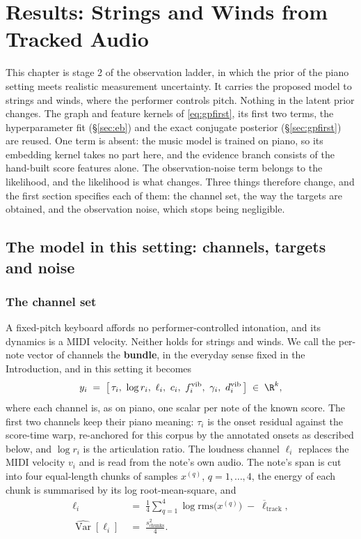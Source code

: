 \chapter{Results: Strings and Winds from Tracked Audio}
\label{ch:phase2}\label{sec:phase2}
This chapter is stage 2 of the observation ladder, in which the prior of
the piano setting meets realistic measurement uncertainty. It carries the
proposed model to strings and winds, where the performer controls pitch.
Nothing in the latent prior changes. The graph and feature kernels of
\eqref{eq:gpfirst}, its first two terms, the hyperparameter fit
(\S\ref{sec:eb}) and the exact conjugate posterior (\S\ref{sec:gpfirst})
are reused. One term is absent: the music model is trained on piano, so
its embedding kernel takes no part here, and the evidence branch consists
of the hand-built score features alone. The observation-noise term belongs
to the likelihood, and the likelihood is what changes. Three things
therefore change, and the first section specifies each of them: the
channel set, the way the targets are obtained, and the observation noise,
which stops being negligible.


\section{The model in this setting: channels, targets and noise}
\label{sec:phase2-delta}

\subsection{The channel set}
A fixed-pitch keyboard affords no performer-controlled intonation, and its
dynamics is a MIDI velocity. Neither holds for strings and winds. We call
the per-note vector of channels the \textbf{bundle}, in the everyday sense
fixed in the Introduction, and in this setting it becomes
\begin{equation}
  y_i \;=\; \bigl[\, \tau_i,\ \log r_i,\ \ell_i,\ c_i,\ f_i^{\mathrm{vib}},\ \gamma_i,\ d_i^{\mathrm{vib}} \,\bigr]
  \;\in\; \R^{k},
  \label{eq:phase2-channels}
\end{equation}
where each channel is, as on piano, one scalar per note of the known
score. The first two channels keep their piano meaning: $\tau_i$ is the
onset residual against the score-time warp, re-anchored for this corpus
by the annotated onsets as described below, and $\log r_i$ is the
articulation ratio. The loudness channel $\ell_i$ replaces the MIDI
velocity $v_i$ and is read from the note's own audio. The note's span is
cut into four equal-length chunks of samples $x^{(q)}$, $q = 1, \dots, 4$,
the energy of each chunk is summarised by its log root-mean-square, and
\begin{align}
  \ell_i &\;=\; \frac{1}{4} \sum_{q=1}^{4} \log \mathrm{rms}\bigl(x^{(q)}\bigr)
  \;-\; \overline{\ell}_{\mathrm{track}},
  \label{eq:loudness}\\
  \widehat{\operatorname{Var}}[\ell_i] &\;=\; \frac{s^2_{\mathrm{chunks}}}{4}.
  \nonumber
\end{align}

